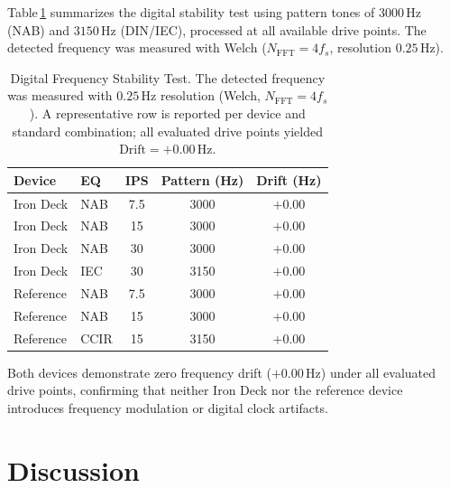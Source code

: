 \documentclass[10pt,conference]{IEEEtran}
\begin{document}
Table\,\ref{tab:estabilidad} summarizes the digital stability test using pattern tones of
$3000\,\text{Hz}$ (NAB) and $3150\,\text{Hz}$ (DIN/IEC), processed at all available drive points.
The detected frequency was measured with Welch ($N_{\text{FFT}} = 4f_s$, resolution $0.25\,\text{Hz}$).

\begin{table}[htbp]
\caption{Digital Frequency Stability Test. The detected frequency was measured
with $0.25\,\text{Hz}$ resolution (Welch, $N_\text{FFT}=4f_s$). A representative row
is reported per device and standard combination; all evaluated drive points
yielded $\text{Drift}=+0.00\,\text{Hz}$.}
\label{tab:estabilidad}
\centering
\small
\begin{tabular}{llccc}
\toprule
Device & EQ & IPS & Pattern (Hz) & Drift (Hz) \\
\midrule
Iron Deck & NAB & 7.5 & 3000 & $+0.00$ \\
Iron Deck & NAB & 15  & 3000 & $+0.00$ \\
Iron Deck & NAB & 30  & 3000 & $+0.00$ \\
Iron Deck & IEC & 30  & 3150 & $+0.00$ \\
\midrule
Reference & NAB  & 7.5 & 3000 & $+0.00$ \\
Reference & NAB  & 15  & 3000 & $+0.00$ \\
Reference & CCIR & 15  & 3150 & $+0.00$ \\
\bottomrule
\end{tabular}
\end{table}

Both devices demonstrate zero frequency drift ($+0.00\,\text{Hz}$) under all evaluated drive points,
confirming that neither Iron Deck nor the reference device introduces frequency modulation or
digital clock artifacts.

\section{Discussion}
\end{document}
